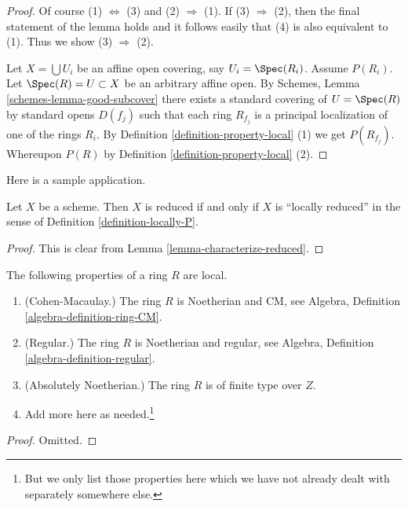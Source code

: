 \begin{proof}
Of course (1) $\Leftrightarrow$ (3) and (2) $\Rightarrow$ (1).
If (3) $\Rightarrow$ (2), then the final statement of the lemma
holds and it follows easily that (4) is also equivalent to (1).
Thus we show (3) $\Rightarrow$ (2).

\medskip\noindent
Let $X = \bigcup U_i$ be an affine open covering, say
$U_i = \Spec(R_i)$. Assume $P(R_i)$.
Let $\Spec(R) = U \subset X$ be an arbitrary affine open.
By Schemes, Lemma \ref{schemes-lemma-good-subcover}
there exists a standard covering of $U = \Spec(R)$ by
standard opens $D(f_j)$ such that each ring $R_{f_j}$ is a
principal localization of one of the rings $R_i$. By
Definition \ref{definition-property-local} (1) we get $P(R_{f_j})$.
Whereupon $P(R)$ by Definition \ref{definition-property-local} (2).
\end{proof}

\noindent
Here is a sample application.

\begin{lemma}
\label{lemma-reduced-is-locally-reduced}
Let $X$ be a scheme. Then $X$ is reduced if and only if $X$ is
``locally reduced'' in the sense of Definition \ref{definition-locally-P}.
\end{lemma}

\begin{proof}
This is clear from Lemma \ref{lemma-characterize-reduced}.
\end{proof}

\begin{lemma}
\label{lemma-properties-local}
The following properties of a ring $R$ are local.
\begin{enumerate}
\item (Cohen-Macaulay.)
The ring $R$ is Noetherian and CM, see
Algebra, Definition \ref{algebra-definition-ring-CM}.
\item (Regular.)
The ring $R$ is Noetherian and regular, see
Algebra, Definition \ref{algebra-definition-regular}.
\item (Absolutely Noetherian.)
The ring $R$ is of finite type over $Z$.
\item Add more here as needed.\footnote{But we only list those properties
here which we have not already dealt with separately somewhere else.}
\end{enumerate}
\end{lemma}

\begin{proof}
Omitted.
\end{proof}















